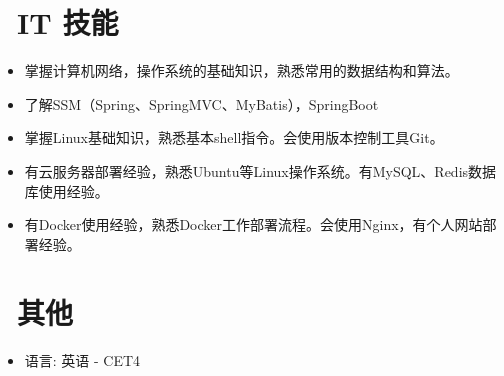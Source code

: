 \documentclass{resume}
\begin{document}
{%


\section{\faCogs\ IT 技能}
\begin{itemize}[parsep=0.5ex]
  \item 掌握计算机网络，操作系统的基础知识，熟悉常用的数据结构和算法。
  \item 了解SSM（Spring、SpringMVC、MyBatis），SpringBoot
  \item 掌握Linux基础知识，熟悉基本shell指令。会使用版本控制工具Git。
  \item 有云服务器部署经验，熟悉Ubuntu等Linux操作系统。有MySQL、Redis数据库使用经验。
  \item 有Docker使用经验，熟悉Docker工作部署流程。会使用Nginx，有个人网站部署经验。
\end{itemize}


\section{\faInfo\ 其他}
\begin{itemize}[parsep=0.5ex]
  \item 语言: 英语 - CET4
\end{itemize}

}
%
%
\end{document}
